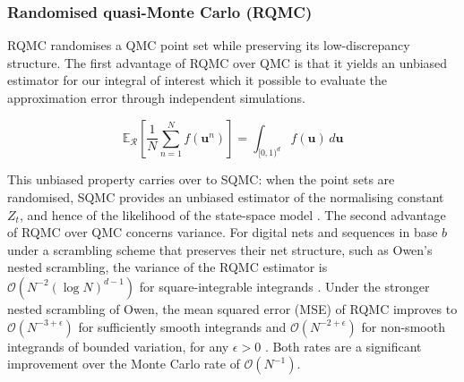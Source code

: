 \subsubsection{Randomised quasi-Monte Carlo (RQMC)}
\label{sec:rqmc}
RQMC randomises a QMC point set while preserving its low-discrepancy structure. The first advantage of RQMC over QMC is that it yields an unbiased estimator for our integral of interest which it possible to evaluate the approximation error through independent simulations.

\begin{equation*}
    \mathbb{E}_{\mathcal{R}}\left[\frac{1}{N}\sum_{n=1}^N f(\mathbf{u}^{n})\right] = \int_{[0,1)^d} f(\mathbf{u})\, d\mathbf{u}
\end{equation*}


This unbiased property carries over to SQMC: when the point sets are randomised, SQMC provides an unbiased estimator of the normalising constant $Z_t$, and hence of the likelihood of the state-space model \citep{chopingerber2015sqmc,delmoral1996}. The second advantage of RQMC over QMC concerns variance. For digital nets and sequences in base $b$ under a scrambling scheme that preserves their net structure, such as Owen's nested scrambling, the variance of the RQMC estimator is $\mathcal{O}(N^{-2} (\log N)^{d-1})$ for square-integrable integrands \citep{owen1997scrambling}. Under the stronger nested scrambling of Owen, the mean squared error (MSE) of RQMC improves to $\mathcal{O}(N^{-3+\epsilon})$ for sufficiently smooth integrands and $\mathcal{O}(N^{-2+\epsilon})$ for non-smooth integrands of bounded variation, for any $\epsilon > 0$ \citep{owen1997scrambling,owen1998scrambling}. Both rates are a significant improvement over the Monte Carlo rate of $\mathcal{O}(N^{-1})$.

